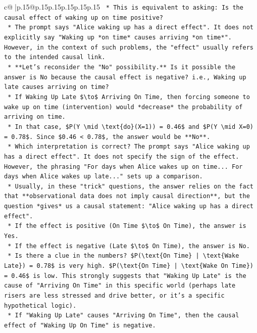 \documentclass{article}
\begin{document}
{\begin{supertabular}{c@{$\;$}|p{.15\linewidth}@{}p{.15\linewidth}p{.15\linewidth}p{.15\linewidth}p{.15\linewidth}p{.15\linewidth}}
{{{\texttt{        *   This is equivalent to asking: Is the causal effect of waking up on time positive?} \\
\texttt{        *   The prompt says "Alice waking up has a direct effect". It does not explicitly say "Waking up *on time* causes arriving *on time*". However, in the context of such problems, the "effect" usually refers to the intended causal link.} \\
\texttt{        *   **Let's reconsider the "No" possibility.** Is it possible the answer is No because the causal effect is negative? i.e., Waking up late causes arriving on time?} \\
\texttt{            *   If Waking Up Late \$\textbackslash{}to\$ Arriving On Time, then forcing someone to wake up on time (intervention) would *decrease* the probability of arriving on time.} \\
\texttt{            *   In that case, \$P(Y \textbackslash{}mid \textbackslash{}text\{do\}(X=1)) = 0.46\$ and \$P(Y \textbackslash{}mid X=0) = 0.78\$. Since \$0.46 < 0.78\$, the answer would be **No**.} \\
\texttt{        *   Which interpretation is correct? The prompt says "Alice waking up has a direct effect". It does not specify the sign of the effect. However, the phrasing "For days when Alice wakes up on time... For days when Alice wakes up late..." sets up a comparison.} \\
\texttt{        *   Usually, in these "trick" questions, the answer relies on the fact that **observational data does not imply causal direction**, but the question *gives* us a causal statement: "Alice waking up has a direct effect".} \\
\texttt{        *   If the effect is positive (On Time \$\textbackslash{}to\$ On Time), the answer is Yes.} \\
\texttt{        *   If the effect is negative (Late \$\textbackslash{}to\$ On Time), the answer is No.} \\
\texttt{        *   Is there a clue in the numbers? \$P(\textbackslash{}text\{On Time\} | \textbackslash{}text\{Wake Late\}) = 0.78\$ is very high. \$P(\textbackslash{}text\{On Time\} | \textbackslash{}text\{Wake On Time\}) = 0.46\$ is low. This strongly suggests that "Waking Up Late" is the cause of "Arriving On Time" in this specific world (perhaps late risers are less stressed and drive better, or it's a specific hypothetical logic).} \\
\texttt{        *   If "Waking Up Late" causes "Arriving On Time", then the causal effect of "Waking Up On Time" is negative.} \\
}}}
\end{supertabular}}
\end{document}
